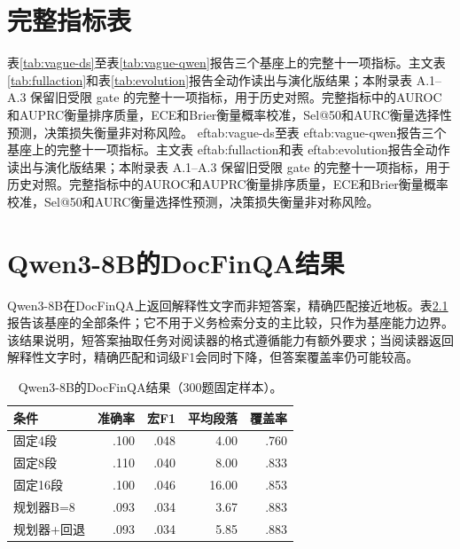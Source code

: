 \chapter{完整指标表}
\label{app:fullmetrics}

表\ref{tab:vague-ds}至表\ref{tab:vague-qwen}报告三个基座上的完整十一项指标。主文表\ref{tab:fullaction}和表\ref{tab:evolution}报告全动作读出与演化版结果；本附录表 A.1--A.3 保留旧受限 gate 的完整十一项指标，用于历史对照。完整指标中的AUROC和AUPRC衡量排序质量，ECE和Brier衡量概率校准，Sel@50和AURC衡量选择性预测，决策损失衡量非对称风险。
ef{tab:vague-ds}至表
ef{tab:vague-qwen}报告三个基座上的完整十一项指标。主文表
ef{tab:fullaction}和表
ef{tab:evolution}报告全动作读出与演化版结果；本附录表 A.1--A.3 保留旧受限 gate 的完整十一项指标，用于历史对照。完整指标中的AUROC和AUPRC衡量排序质量，ECE和Brier衡量概率校准，Sel@50和AURC衡量选择性预测，决策损失衡量非对称风险。







\chapter{Qwen3-8B的DocFinQA结果}
\label{app:qwen}

Qwen3-8B在DocFinQA上返回解释性文字而非短答案，精确匹配接近地板。表\ref{tab:qwen-doc}报告该基座的全部条件；它不用于义务检索分支的主比较，只作为基座能力边界。该结果说明，短答案抽取任务对阅读器的格式遵循能力有额外要求；当阅读器返回解释性文字时，精确匹配和词级F1会同时下降，但答案覆盖率仍可能较高。

\begin{table}[htbp]
\centering
{}
\setlength{\tabcolsep}{4pt}
\caption{Qwen3-8B的DocFinQA结果（300题固定样本）。}
\label{tab:qwen-doc}
\begin{tabular}{lrrrr}
\toprule
条件 & 准确率 & 宏F1 & 平均段落 & 覆盖率 \\
\midrule
固定4段 & .100 & .048 & 4.00 & .760 \\
固定8段 & .110 & .040 & 8.00 & .833 \\
固定16段 & .100 & .046 & 16.00 & .853 \\
规划器B=8 & .093 & .034 & 3.67 & .883 \\
规划器+回退 & .093 & .034 & 5.85 & .883 \\
\bottomrule
\end{tabular}
\end{table}

